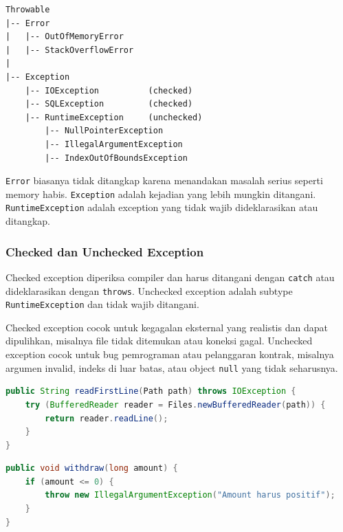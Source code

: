 \begin{lstlisting}[caption={Hierarki konseptual Throwable}, label={lst:exception-hierarchy}]
Throwable
|-- Error
|   |-- OutOfMemoryError
|   |-- StackOverflowError
|
|-- Exception
    |-- IOException          (checked)
    |-- SQLException         (checked)
    |-- RuntimeException     (unchecked)
        |-- NullPointerException
        |-- IllegalArgumentException
        |-- IndexOutOfBoundsException
\end{lstlisting}

\texttt{Error} biasanya tidak ditangkap karena menandakan masalah serius seperti memory habis. \texttt{Exception} adalah kejadian yang lebih mungkin ditangani. \texttt{RuntimeException} adalah exception yang tidak wajib dideklarasikan atau ditangkap.

\subsubsection{Checked dan Unchecked Exception}

\begin{jawab}
Checked exception diperiksa compiler dan harus ditangani dengan \texttt{catch} atau dideklarasikan dengan \texttt{throws}. Unchecked exception adalah subtype \texttt{RuntimeException} dan tidak wajib ditangani.
\end{jawab}

Checked exception cocok untuk kegagalan eksternal yang realistis dan dapat dipulihkan, misalnya file tidak ditemukan atau koneksi gagal. Unchecked exception cocok untuk bug pemrograman atau pelanggaran kontrak, misalnya argumen invalid, indeks di luar batas, atau object \texttt{null} yang tidak seharusnya.

\begin{lstlisting}[language=Java, caption={Checked exception wajib ditangani atau dideklarasikan}, label={lst:checked-exception}]
public String readFirstLine(Path path) throws IOException {
    try (BufferedReader reader = Files.newBufferedReader(path)) {
        return reader.readLine();
    }
}
\end{lstlisting}

\begin{lstlisting}[language=Java, caption={Unchecked exception untuk argumen invalid}, label={lst:unchecked-exception}]
public void withdraw(long amount) {
    if (amount <= 0) {
        throw new IllegalArgumentException("Amount harus positif");
    }
}
\end{lstlisting}

